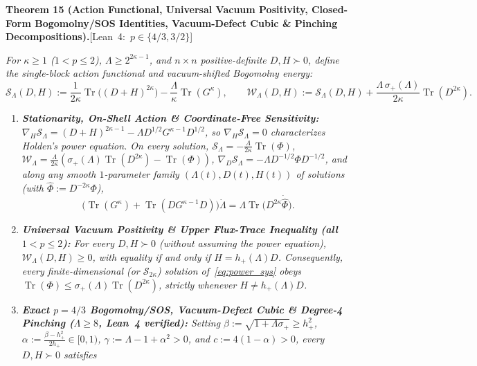 \documentclass[10pt,letterpaper]{article}
\newcommand{\leanbadge}[1]{\mbox{\sffamily\scriptsize\color{leanborder}[#1]}}
\newcommand{\Tr}{\operatorname{Tr}}
\begin{document}
\begin{tcolorbox}[mathbox]
\textbf{Theorem 15 (Action Functional, Universal Vacuum Positivity, Closed-Form Bogomolny/SOS Identities, Vacuum-Defect Cubic \& Pinching Decompositions).}\hfill\leanbadge{Lean~4: $p\in\{4/3, 3/2\}$}\par\vspace{1.5pt}
\emph{For $\kappa \ge 1$ ($1 < p \le 2$), $\Lambda \ge 2^{2\kappa-1}$, and $n\times n$ positive-definite $D, H \succ 0$, define the single-block action functional and vacuum-shifted Bogomolny energy:}
\[
  \mathcal{S}_\Lambda(D, H) := \frac{1}{2\kappa}\Tr\bigl((D + H)^{2\kappa}\bigr) - \frac{\Lambda}{\kappa}\Tr(G^\kappa),
  \qquad
  \mathcal{W}_\Lambda(D, H) := \mathcal{S}_\Lambda(D, H) + \frac{\Lambda\,\sigma_+(\Lambda)}{2\kappa}\Tr(D^{2\kappa}).
\]
\begin{enumerate}[label=(\alph*),leftmargin=1.8em,itemsep=2pt,topsep=2pt]
  \item \emph{\textbf{Stationarity, On-Shell Action \& Coordinate-Free Sensitivity:} $\nabla_H \mathcal{S}_\Lambda = (D+H)^{2\kappa-1} - \Lambda D^{1/2} G^{\kappa-1} D^{1/2}$, so $\nabla_H \mathcal{S}_\Lambda = 0$ characterizes Holden's power equation. On every solution, $\mathcal{S}_\Lambda = -\frac{\Lambda}{2\kappa}\Tr(\Phi)$, $\mathcal{W}_\Lambda = \frac{\Lambda}{2\kappa}(\sigma_+(\Lambda)\Tr(D^{2\kappa}) - \Tr(\Phi))$, $\nabla_D \mathcal{S}_\Lambda = -\Lambda D^{-1/2}\Phi D^{-1/2}$, and along any smooth $1$-parameter family $(\Lambda(t), D(t), H(t))$ of solutions (with $\widehat{\Phi} := D^{-2\kappa}\Phi$),}
  \begin{equation}\label{eq:sensitivity}
    \bigl(\Tr(G^\kappa) + \Tr(D G^{\kappa-1} D)\bigr)\dot{\Lambda} = \Lambda\Tr\bigl(D^{2\kappa}\dot{\widehat{\Phi}}\bigr).
  \end{equation}
  \item \emph{\textbf{Universal Vacuum Positivity \& Upper Flux-Trace Inequality (all $1 < p \le 2$):} For every $D, H \succ 0$ (without assuming the power equation), $\mathcal{W}_\Lambda(D, H) \ge 0$, with equality if and only if $H = h_+(\Lambda) D$. Consequently, every finite-dimensional (or $\mathcal{S}_{2\kappa}$) solution of~\eqref{eq:power_sys} obeys $\Tr(\Phi) \le \sigma_+(\Lambda)\Tr(D^{2\kappa})$, strictly whenever $H \neq h_+(\Lambda) D$.}
  \item \emph{\textbf{Exact $p = 4/3$ Bogomolny/SOS, Vacuum-Defect Cubic \& Degree-4 Pinching ($\Lambda \ge 8$, Lean~4 verified):} Setting $\beta := \sqrt{1+\Lambda\sigma_+} \ge h_+^2$, $\alpha := \frac{\beta - h_+^2}{2h_+} \in [0, 1)$, $\gamma := \Lambda - 1 + \alpha^2 > 0$, and $c := 4(1 - \alpha) > 0$, every $D, H \succ 0$ satisfies}

\end{enumerate}
\end{tcolorbox}
\end{document}
